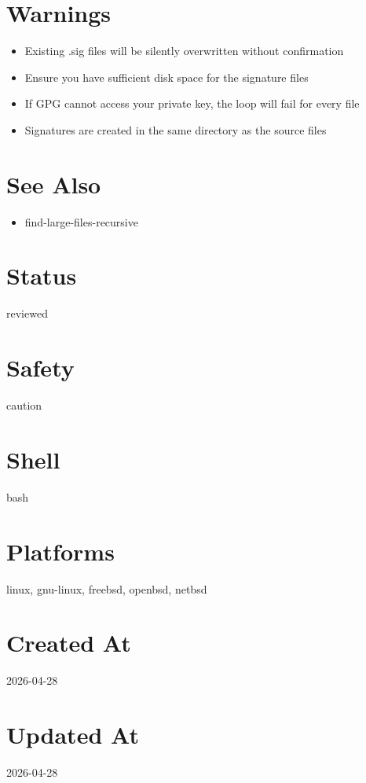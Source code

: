 \documentclass{article}
\begin{document}
\section*{Warnings}
\begin{itemize}
  \item Existing .sig files will be silently overwritten without confirmation
  \item Ensure you have sufficient disk space for the signature files
  \item If GPG cannot access your private key, the loop will fail for every file
  \item Signatures are created in the same directory as the source files
\end{itemize}

\section*{See Also}
\begin{itemize}
  \item find-large-files-recursive
\end{itemize}

\section*{Status}
reviewed

\section*{Safety}
caution

\section*{Shell}
bash

\section*{Platforms}
linux, gnu-linux, freebsd, openbsd, netbsd

\section*{Created At}
2026-04-28

\section*{Updated At}
2026-04-28
\end{document}
